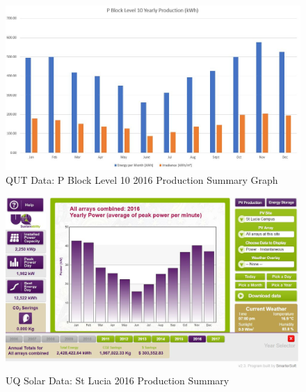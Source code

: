 \begin{figure}[H]
	\hfill\includegraphics[width = 150mm]{images/metering/meteo/p-block-lvl10-yearly-production}\hspace*{\fill}
	\caption{QUT Data: P Block Level 10 2016 Production Summary Graph} 
	\label{fig:qut-pv-lvl10-2016}
\end{figure}  

\begin{figure}[H]
	\hfill\includegraphics[width = 150mm]{images/metering/uq/St-Lucia-2016-Total}\hspace*{\fill}
	\caption{UQ Solar Data: St Lucia 2016 Production Summary \cite{website:UQData1}} 
	\label{fig:uq-pv-st-lucia-2016}
\end{figure} 


